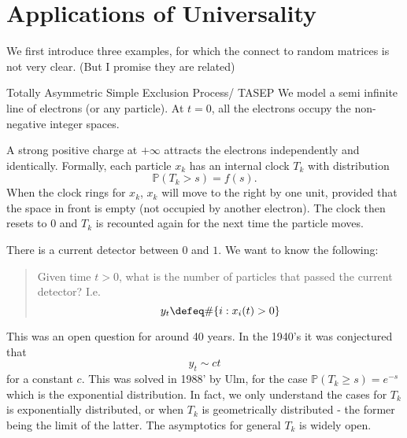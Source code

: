 \section{Applications of Universality}

We first introduce three examples, for which the connect to random matrices is not very clear. (But I promise they are related)

\begin{aexample}{Totally Asymmetric Simple Exclusion Process/ TASEP}{}
    We model a semi infinite line of electrons (or any particle). At $t=0$, all the electrons occupy the non-negative integer spaces. 

    \begin{center}
        
    \end{center}

    A strong positive charge at $+\infty$ attracts the electrons independently and identically. Formally, each particle $x_k$ has an internal clock $T_k$ with distribution \[
    \mathbb{P}(T_k> s) = f(s).
    \]
    When the clock rings for $x_k$, $x_k$ will move to the right by one unit, provided that the space in front is empty (not occupied by another electron). The clock then resets to $0$ and $T_k$ is recounted again for the next time the particle moves.
    
    There is a current detector between $0$ and $1$. We want to know the following:
    
    \begin{quote}
        Given time $t>0$, what is the number of particles that passed the current detector? I.e. \[
        y_t \defeq \#\{i:x_i(t)>0\}
        \]
    \end{quote}

\end{aexample}

This was an open question for around 40 years. In the 1940's it was conjectured that \[
y_t \sim ct
\]
for a constant $c$. This was solved in 1988' by Ulm, for the case $\mathbb{P}(T_k\geq s) = e^{-s}$ which is the exponential distribution. In fact, we only understand the cases for $T_k$ is exponentially distributed, or when $T_k$ is geometrically distributed - the former being the limit of the latter. The asymptotics for general $T_k$ is widely open.

